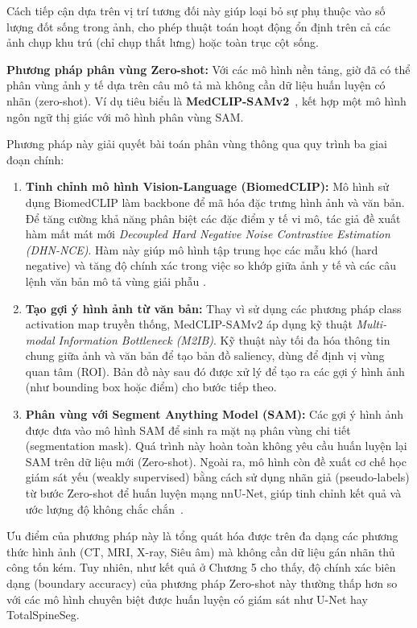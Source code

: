 Cách tiếp cận dựa trên vị trí tương đối này giúp loại bỏ sự phụ thuộc vào số lượng đốt sống trong ảnh, cho phép thuật toán hoạt động ổn định trên cả các ảnh chụp khu trú (chỉ chụp thắt lưng) hoặc toàn trục cột sống.

\textbf{Phương pháp phân vùng Zero-shot:} Với các mô hình nền tảng, giờ đã có thể phân vùng ảnh y tế dựa trên câu mô tả mà không cần dữ liệu huấn luyện có nhãn (zero-shot). Ví dụ tiêu biểu là \textbf{MedCLIP-SAMv2}~\cite{koleilat2025medclipsamv2}, kết hợp một mô hình ngôn ngữ thị giác với mô hình phân vùng SAM.

Phương pháp này giải quyết bài toán phân vùng thông qua quy trình ba giai đoạn chính:

\begin{enumerate}
    \item \textbf{Tinh chỉnh mô hình Vision-Language (BiomedCLIP):} 
    Mô hình sử dụng BiomedCLIP làm backbone để mã hóa đặc trưng hình ảnh và văn bản. Để tăng cường khả năng phân biệt các đặc điểm y tế vi mô, tác giả đề xuất hàm mất mát mới \textit{Decoupled Hard Negative Noise Contrastive Estimation (DHN-NCE)}. Hàm này giúp mô hình tập trung học các mẫu khó (hard negative) và tăng độ chính xác trong việc so khớp giữa ảnh y tế và các câu lệnh văn bản mô tả vùng giải phẫu \cite{koleilat2025medclipsamv2}.

    \item \textbf{Tạo gợi ý hình ảnh từ văn bản:} 
    Thay vì sử dụng các phương pháp class activation map truyền thống, MedCLIP-SAMv2 áp dụng kỹ thuật \textit{Multi-modal Information Bottleneck (M2IB)}. Kỹ thuật này tối đa hóa thông tin chung giữa ảnh và văn bản để tạo bản đồ saliency, dùng để định vị vùng quan tâm (ROI). Bản đồ này sau đó được xử lý để tạo ra các gợi ý hình ảnh (như bounding box hoặc điểm) cho bước tiếp theo.

    \item \textbf{Phân vùng với Segment Anything Model (SAM):} 
    Các gợi ý hình ảnh được đưa vào mô hình SAM để sinh ra mặt nạ phân vùng chi tiết (segmentation mask). Quá trình này hoàn toàn không yêu cầu huấn luyện lại SAM trên dữ liệu mới (Zero-shot). Ngoài ra, mô hình còn đề xuất cơ chế học giám sát yếu (weakly supervised) bằng cách sử dụng nhãn giả (pseudo-labels) từ bước Zero-shot để huấn luyện mạng nnU-Net, giúp tinh chỉnh kết quả và ước lượng độ không chắc chắn~\cite{koleilat2025medclipsamv2}.
\end{enumerate}

Ưu điểm của phương pháp này là tổng quát hóa được trên đa dạng các phương thức hình ảnh (CT, MRI, X-ray, Siêu âm) mà không cần dữ liệu gán nhãn thủ công tốn kém. Tuy nhiên, như kết quả ở Chương 5 cho thấy, độ chính xác biên dạng (boundary accuracy) của phương pháp Zero-shot này thường thấp hơn so với các mô hình chuyên biệt được huấn luyện có giám sát như U-Net hay TotalSpineSeg.

